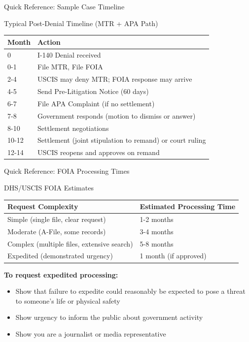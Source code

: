 \documentclass[11pt]{beamer}
\begin{document}
	\begin{frame}{Quick Reference: Sample Case Timeline}
		\scriptsize
		\begin{block}{Typical Post-Denial Timeline (MTR + APA Path)}
			\centering
			\begin{tabular}{|p{3cm}|p{6cm}|}
				\hline
				\textbf{Month} & \textbf{Action} \\
				\hline
				0 & I-140 Denial received \\
				\hline
				0-1 & File MTR, File FOIA \\
				\hline
				2-4 & USCIS may deny MTR; FOIA response may arrive \\
				\hline
				4-5 & Send Pre-Litigation Notice (60 days) \\
				\hline
				6-7 & File APA Complaint (if no settlement) \\
				\hline
				7-8 & Government responds (motion to dismiss or answer) \\
				\hline
				8-10 & Settlement negotiations \\
				\hline
				10-12 & Settlement (joint stipulation to remand) or court ruling \\
				\hline
				12-14 & USCIS reopens and approves on remand \\
				\hline
			\end{tabular}
		\end{block}
	\end{frame}
	
	\begin{frame}{Quick Reference: FOIA Processing Times}
		\scriptsize
		\begin{block}{DHS/USCIS FOIA Estimates}
			\centering
			\begin{tabular}{|p{5cm}|p{4cm}|}
				\hline
				\textbf{Request Complexity} & \textbf{Estimated Processing Time} \\
				\hline
				Simple (single file, clear request) & 1-2 months \\
				\hline
				Moderate (A-File, some records) & 3-4 months \\
				\hline
				Complex (multiple files, extensive search) & 5-8 months \\
				\hline
				Expedited (demonstrated urgency) & 1 month (if approved) \\
				\hline
			\end{tabular}
			\vspace{0.2cm}
			\textbf{To request expedited processing:}
			\begin{itemize}
				\item Show that failure to expedite could reasonably be expected to pose a threat to someone's life or physical safety
				\item Show urgency to inform the public about government activity
				\item Show you are a journalist or media representative
			\end{itemize}
		\end{block}
	\end{frame}
	
\end{document}
